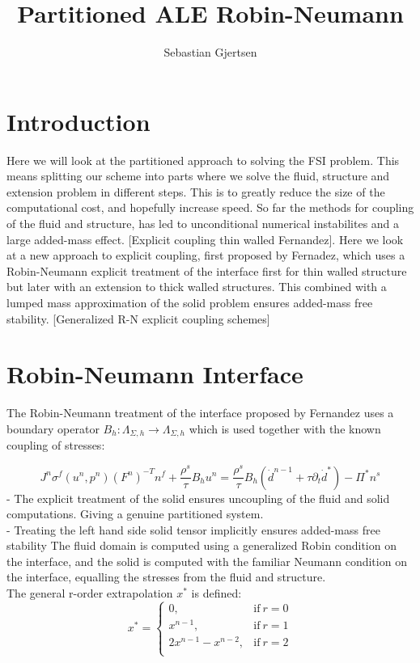 
\usepackage{listings}
\usepackage{amsmath}
\title{Partitioned ALE Robin-Neumann}
\author{Sebastian Gjertsen}

\maketitle


\section*{Introduction}
Here we will look at the partitioned approach to solving the FSI problem. This means splitting our scheme into parts where we solve the fluid, structure and extension problem in different steps. This is to greatly reduce the size of the computational cost, and hopefully increase speed. So far the methods for coupling of the fluid and structure, has led to unconditional numerical instabilites and a large added-mass effect. [Explicit coupling thin walled Fernandez]. Here we look at a new approach to explicit coupling, first proposed by Fernadez, which uses a Robin-Neumann explicit treatment of the interface first for thin walled structure but later with an extension to thick walled structures. This combined with a lumped mass approximation of the solid problem ensures added-mass free stability. [Generalized R-N explicit coupling schemes]

\section*{Robin-Neumann Interface}
The Robin-Neumann treatment of the interface proposed by Fernandez uses a boundary operator $ B_h : \Lambda_{\Sigma, h} \rightarrow \Lambda_{\Sigma, h}  $ which is used together with the known coupling of stresses:

$$  J^n \sigma^f(u^n, p^n)(F^n)^{-T}n^f + \frac{\rho^s}{\tau} B_h u^n = \frac{\rho^s}{\tau} B_h (\dot{d}^{n-1} + \tau \partial_t \dot{d}^*  ) - \Pi^{*} n^s $$
- The explicit treatment of the solid ensures uncoupling of the fluid and solid computations. Giving a genuine partitioned system. \\
- Treating the left hand side solid tensor implicitly ensures added-mass free stability
The fluid domain is computed using a generalized Robin condition on the interface, and the solid is computed with the familiar Neumann condition on the interface, equalling the stresses from the fluid and structure.\\
The general r-order extrapolation $x^*$ is defined: 
\begin{equation}
    x^*=
    \begin{cases}
      0, & \text{if}\ r=0 \\
      x^{n-1}, & \text{if}\ r =1 \\
      2x^{n-1} - x^{n-2}, & \text{if}\ r =2 \\
    \end{cases}
\end{equation}

